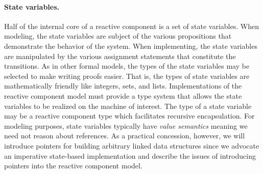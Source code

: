 
\paragraph{State variables.}
Half of the internal core of a reactive component is a set of state variables.
When modeling, the state variables are subject of the various propositions that demonstrate the behavior of the system.
When implementing, the state variables are manipulated by the various assignment statements that constitute the transitions.
As in other formal models, the types of the state variables may be selected to make writing proofs easier.
That is, the types of state variables are mathematically friendly like integers, sets, and lists.
Implementations of the reactive component model must provide a type system that allows the state variables to be realized on the machine of interest.
The type of a state variable may be a reactive component type which facilitates recursive encapsulation.
For modeling purposes, state variables typically have \emph{value semantics} meaning we need not reason about references.
As a practical concession, however, we will introduce pointers for building arbitrary linked data structures since we advocate an imperative state-based implementation and describe the issues of introducing pointers into the reactive component model.

